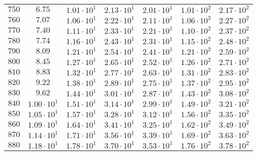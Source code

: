 \begin{table}[h]
\begin{tabular}{lcccccc}
$	750	$ & $	6.75 	$ & $	1.01 \cdot 10^{1} 	$ & $	2.13 \cdot 10^{1} 	$ & $	2.01 \cdot 10^{1} 	$ & $	1.01 \cdot 10^{2} 	$ & $	2.17 \cdot 10^{2} 	 $ \\
$	760	$ & $	7.07 	$ & $	1.06 \cdot 10^{1} 	$ & $	2.22 \cdot 10^{1} 	$ & $	2.11 \cdot 10^{1} 	$ & $	1.06 \cdot 10^{2} 	$ & $	2.27 \cdot 10^{2} 	 $ \\
$	770	$ & $	7.40 	$ & $	1.11 \cdot 10^{1} 	$ & $	2.33 \cdot 10^{1} 	$ & $	2.21 \cdot 10^{1} 	$ & $	1.10 \cdot 10^{2} 	$ & $	2.37 \cdot 10^{2} 	 $ \\
$	780	$ & $	7.74 	$ & $	1.16 \cdot 10^{1} 	$ & $	2.43 \cdot 10^{1} 	$ & $	2.31 \cdot 10^{1} 	$ & $	1.15 \cdot 10^{2} 	$ & $	2.48 \cdot 10^{2} 	 $ \\
$	790	$ & $	8.09 	$ & $	1.21 \cdot 10^{1} 	$ & $	2.54 \cdot 10^{1} 	$ & $	2.41 \cdot 10^{1} 	$ & $	1.21 \cdot 10^{2} 	$ & $	2.59 \cdot 10^{2} 	 $ \\
$	800	$ & $	8.45 	$ & $	1.27 \cdot 10^{1} 	$ & $	2.65 \cdot 10^{1} 	$ & $	2.52 \cdot 10^{1} 	$ & $	1.26 \cdot 10^{2} 	$ & $	2.71 \cdot 10^{2} 	 $ \\
$	810	$ & $	8.83 	$ & $	1.32 \cdot 10^{1} 	$ & $	2.77 \cdot 10^{1} 	$ & $	2.63 \cdot 10^{1} 	$ & $	1.31 \cdot 10^{2} 	$ & $	2.83 \cdot 10^{2} 	 $ \\
$	820	$ & $	9.22 	$ & $	1.38 \cdot 10^{1} 	$ & $	2.89 \cdot 10^{1} 	$ & $	2.75 \cdot 10^{1} 	$ & $	1.37 \cdot 10^{2} 	$ & $	2.95 \cdot 10^{2} 	 $ \\
$	830	$ & $	9.62 	$ & $	1.44 \cdot 10^{1} 	$ & $	3.01 \cdot 10^{1} 	$ & $	2.87 \cdot 10^{1} 	$ & $	1.43 \cdot 10^{2} 	$ & $	3.08 \cdot 10^{2} 	 $ \\
$	840	$ & $	1.00 \cdot 10^{1} 	$ & $	1.51 \cdot 10^{1} 	$ & $	3.14 \cdot 10^{1} 	$ & $	2.99 \cdot 10^{1} 	$ & $	1.49 \cdot 10^{2} 	$ & $	3.21 \cdot 10^{2} 	 $ \\
$	850	$ & $	1.05 \cdot 10^{1} 	$ & $	1.57 \cdot 10^{1} 	$ & $	3.28 \cdot 10^{1} 	$ & $	3.12 \cdot 10^{1} 	$ & $	1.56 \cdot 10^{2} 	$ & $	3.35 \cdot 10^{2} 	 $ \\
$	860	$ & $	1.09 \cdot 10^{1} 	$ & $	1.64 \cdot 10^{1} 	$ & $	3.41 \cdot 10^{1} 	$ & $	3.25 \cdot 10^{1} 	$ & $	1.62 \cdot 10^{2} 	$ & $	3.49 \cdot 10^{2} 	 $ \\
$	870	$ & $	1.14 \cdot 10^{1} 	$ & $	1.71 \cdot 10^{1} 	$ & $	3.56 \cdot 10^{1} 	$ & $	3.39 \cdot 10^{1} 	$ & $	1.69 \cdot 10^{2} 	$ & $	3.63 \cdot 10^{2} 	 $ \\
$	880	$ & $	1.18 \cdot 10^{1} 	$ & $	1.78 \cdot 10^{1} 	$ & $	3.70 \cdot 10^{1} 	$ & $	3.53 \cdot 10^{1} 	$ & $	1.76 \cdot 10^{2} 	$ & $	3.78 \cdot 10^{2} 	 $ \\

\end{tabular}
\end{table}

